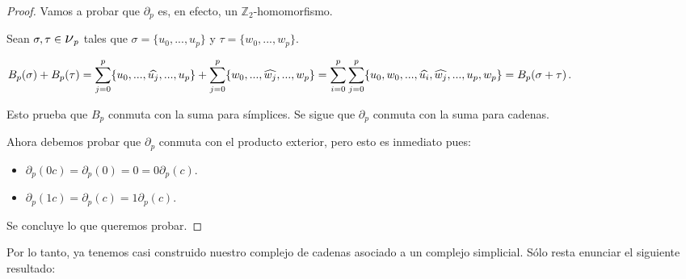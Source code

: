 \documentclass[12pt, a4paper, twoside]{book}
\numberwithin{equation}{section}
\theoremstyle{definition}
\theoremstyle{remark}
\theoremstyle{plain}
\begin{document}
	\begin{proof}
		Vamos a probar que $\partial_{p}$ es, en efecto, un 
		$\mathbb{Z}_{2}$-homomorfismo.

		Sean $\sigma,\tau \in \text{{\Large $\nu$}}_{p}$ tales que
		$\sigma = \{u_{0},...,u_{p}\}$ y $\tau = \{w_{0},...,w_{p}\}$.

		$B_{p}(\sigma)+B_{p}(\tau)=\displaystyle 
		\sum_{j=0}^{p}\{u_{0},...,\widehat{u_{j}},...,u_{p}\} + 
		\displaystyle \sum_{j=0}^{p}\{w_{0},...,\widehat{w_{j}},...,
		w_{p}\}=\displaystyle \sum_{i=0}^{p}\sum_{j=0}^{p}\{u_{0}, 
		w_{0},...,\widehat{u_{i}},\\\widehat{w_{j}},...,u_{p},w_{p}\}=
		B_{p}(\sigma+\tau)$. 

		Esto prueba que $B_{p}$ conmuta con la suma para 
		símplices. Se sigue que $\partial_{p}$ conmuta 
		con la suma para cadenas.

		Ahora debemos probar que $\partial_{p}$ conmuta con el 
		producto exterior, pero esto es inmediato pues:
		\begin{itemize}
			\item $\partial_{p}(0c)=\partial_{p}(0)=0=
				0\partial_{p}(c)$.
			\item $\partial_{p}(1c)=\partial_{p}(c)=
				1\partial_{p}(c)$.
		\end{itemize}
		Se concluye lo que queremos probar.
	\end{proof}

	Por lo tanto, ya tenemos casi construido nuestro complejo de cadenas 
	asociado a un complejo simplicial. Sólo resta enunciar el siguiente 
	resultado:
\end{document}
